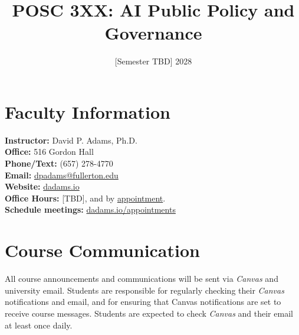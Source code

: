 \documentclass[12pt]{article}
\title{POSC 3XX: AI Public Policy and Governance}
\author{}
\date{[Semester TBD] 2028}
\begin{document}
\makeatletter
\renewcommand{\maketitle}{%
    \begin{center}
        \vspace{0.75em}
        {\LARGE \@title\par}
        \vspace{0.25em}
        {\large \@date\par}
    \end{center}
    \vspace{1em}
}
\makeatother

\maketitle

\section*{Faculty Information}
\noindent \textbf{Instructor:} David P. Adams, Ph.D. \\
\noindent \textbf{Office:} 516 Gordon Hall \\
\noindent \textbf{Phone/Text:} (657) 278-4770 \\
\noindent \textbf{Email:} \href{mailto:dpadams@fullerton.edu}{dpadams@fullerton.edu} \\
\noindent \textbf{Website:} \href{https://dadams.io}{dadams.io} \\
\noindent \textbf{Office Hours:} [TBD], and by \href{https://dadams.io/appointments}{appointment}. \\
\noindent \textbf{Schedule meetings:} \href{https://dadams.io/appointments}{dadams.io/appointments}

\section*{Course Communication}
All course announcements and communications will be sent via \emph{Canvas} and university email. Students are responsible for regularly checking their \emph{Canvas} notifications and email, and for ensuring that Canvas notifications are set to receive course messages. Students are expected to check \emph{Canvas} and their email at least once daily.
\end{document}
